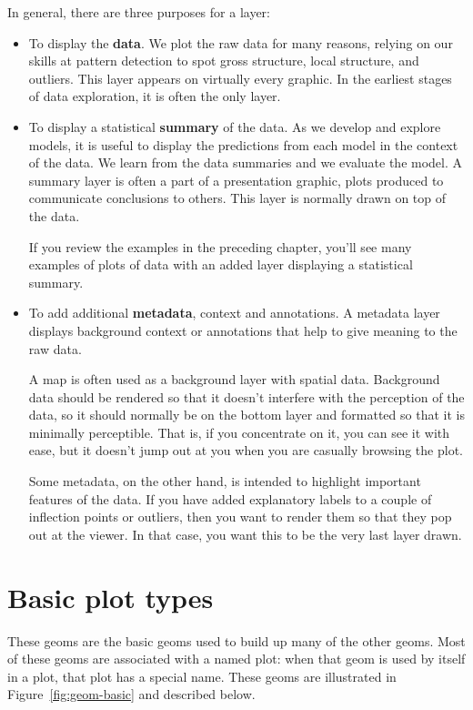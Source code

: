 In general, there are three purposes for a layer:

\begin{itemize}
  \item To display the {\bf data}.  We plot the raw data for many reasons, relying on our skills at pattern detection to spot gross structure, local structure, and outliers.  This layer appears on virtually every graphic.  In the earliest stages of data exploration, it is often the only layer.

  \item To display a statistical {\bf summary} of the data. As we develop and explore models, it is useful to display the predictions from each model in the context of the data. We learn from the data summaries and we evaluate the model. A summary layer is often a part of a presentation graphic, plots produced to communicate conclusions to others. This layer is normally drawn on top of the data.

  If you review the examples in the preceding chapter, you'll see many examples of plots of data with an added layer displaying a statistical summary.

  \item To add additional {\bf metadata}, context and annotations. A metadata layer displays background context or annotations that help to give meaning to the raw data. 
  
  A map is often used as a background layer with spatial data. Background data should be rendered so that it doesn't interfere with the perception of the data, so it should normally be on the bottom layer and formatted so that it is minimally perceptible. That is, if you concentrate on it, you can see it with ease, but it doesn't jump out at you when you are casually browsing the plot.

  Some metadata, on the other hand, is intended to highlight important features of the data. If you have added explanatory labels to a couple of inflection points or outliers, then you want to render them so that they pop out at the viewer. In that case, you want this to be the very last layer drawn.

\end{itemize}


\section{Basic plot types}\label{sec:basics}

These geoms are the basic geoms used to build up many of the other geoms.  Most of these geoms are associated with a named plot: when that geom is used by itself in a plot, that plot has a special name.  These geoms are illustrated in Figure~\ref{fig:geom-basic} and described below.


